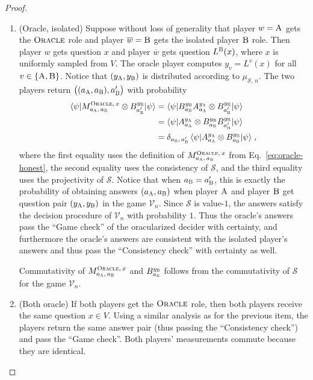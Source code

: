 \documentclass[11pt]{article}
\theoremstyle{definition}
\newcommand{\ket}[1]{|#1\rangle}
\newcommand{\bra}[1]{\langle#1|}
\newcommand{\sampler}{\mathcal{S}}
\newcommand{\verifier}{\mathcal{V}}
\newcommand{\strategy}{\mathscr{S}}
\newcommand{\labelstyle}[1]{\ensuremath{\textsc{#1}}\xspace}
\newcommand{\alice}{\labelstyle{A}}
\newcommand{\bob}{\labelstyle{B}}
\newcommand{\oracle}{\labelstyle{Oracle}}
\newcommand{\ab}{\{\alice, \bob\}}
\newcommand{\typestyle}[1]{\ensuremath{\textsc{#1}}\xspace}
\newcommand{\Oracle}{\typestyle{Oracle}}
\begin{document}
\begin{proof}
  \begin{enumerate}
  \item ({Oracle, isolated}) Suppose without loss of generality that player
    $w=\alice$ gets the $\oracle$ role and player $\overline{w}=\bob$ gets the
    isolated player $\bob$ role.
    Then player $w$ gets question $x$ and player $\overline{w}$ gets question
    $L^\bob(x)$, where $x$ is uniformly sampled from $V$.
    The oracle player computes $y_v = L^v(x)$ for all $v \in \ab$.
    Notice that $(y_\alice, y_\bob)$ is distributed according to
    $\mu_{\sampler,\, n}$.
    The two players return $\bigl( (a_\alice, a_\bob), a'_\bob \bigr)$ with
    probability
    \begin{align*}
      \bra{\psi} M^{\oracle,\, x}_{a_\alice,\, a_\bob} \otimes
      B^{y_\bob}_{a'_\bob} \ket{\psi}
      & = \bra{\psi} B^{y_\bob}_{a_\bob} A^{y_\alice}_{a_\alice} \otimes
        B^{y_\bob}_{a'_\bob} \ket{\psi}\\
      & = \bra{\psi}  A^{y_\alice}_{a_\alice} \otimes
        B^{y_\bob}_{a_\bob} B^{y_\bob}_{a'_\bob} \ket{\psi}\\
      & = \delta_{a_\bob,\, a'_\bob}\, \bra{\psi} A^{y_\alice}_{a_\alice} \otimes
        B^{y_\bob}_{a_\bob} \ket{\psi}\;,
    \end{align*}
    where the first equality uses the definition of $M^{\oracle,\,
      x}_{a_\alice,\, a_\bob}$ from Eq.~\eqref{eq:oracle-honest}, the second
    equality uses the consistency of $\strategy$, and the third equality uses
    the projectivity of $\strategy$.
    Notice that when $a_\bob = a'_\bob$, this is exactly the probability of
    obtaining answers $(a_\alice,a_\bob)$ when player $\alice$ and player $\bob$
    get question pair $(y_\alice,y_\bob)$ in the game $\verifier_n$.
    Since $\strategy$ is value-$1$, the answers satisfy the decision procedure
    of $\verifier_n$ with probability $1$.
    Thus the oracle's answers pass the ``Game check'' of the oracularized
    decider with certainty, and furthermore the oracle's answers are consistent
    with the isolated player's answers and thus pass the ``Consistency check''
    with certainty as well.
	
    Commutativity of $M^{\Oracle,\, x}_{a_\alice,\, a_\bob}$ and
    $B^{y_\bob}_{a_\bob}$ follows from the commutativity of $\strategy$ for the
    game $\verifier_n$.

  \item ({Both oracle}) If both players get the $\oracle$ role, then both
    players receive the same question $x \in V$.
    Using a similar analysis as for the previous item, the players return the
    same answer pair (thus passing the ``Consistency check'') and pass the
    ``Game check''.
    Both players' measurements commute because they are identical.


\end{enumerate}
\end{proof}
\end{document}
